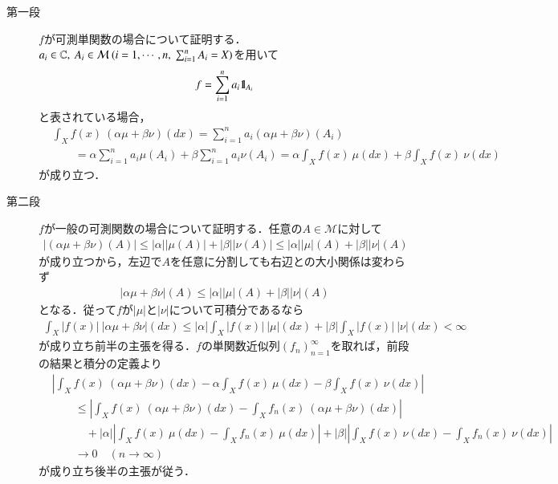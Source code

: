 	\begin{prf}
		\begin{description}
			\item[第一段]
				$f$が可測単関数の場合について証明する．
				$a_i \in \C,\ A_i \in \mathcal{M}\ (i=1,\cdots,n,\ \sum_{i=1}^{n} A_i = X)$を用いて
				\begin{align}
					f = \sum_{i=1}^{n} a_i \mbox{1}\hspace{-0.25em}\mbox{l}_{A_i}
				\end{align}
				と表されている場合，
				\begin{align}
					&\int_X f(x)\ (\alpha\mu + \beta\nu)(dx)
					= \sum_{i=1}^{n} a_i (\alpha\mu + \beta\nu)(A_i) \\
					&\qquad = \alpha \sum_{i=1}^{n} a_i \mu(A_i) + \beta \sum_{i=1}^{n} a_i \nu(A_i)
					= \alpha \int_X f(x)\ \mu(dx) + \beta \int_X f(x)\ \nu(dx)
				\end{align}
				が成り立つ．
				
			\item[第二段]
			$f$が一般の可測関数の場合について証明する．任意の$A \in \mathcal{M}$に対して
			\begin{align}
				\left| (\alpha \mu + \beta \nu)(A) \right| \leq |\alpha||\mu(A)| + |\beta||\nu(A)| \leq |\alpha||\mu|(A) + |\beta||\nu|(A)
 			\end{align}
 			が成り立つから，左辺で$A$を任意に分割しても右辺との大小関係は変わらず
 			\begin{align}
 				|\alpha \mu + \beta \nu|(A) \leq |\alpha||\mu|(A) + |\beta||\nu|(A)
 			\end{align}
 			となる．従って$f$が$|\mu|$と$|\nu|$について可積分であるなら
 			\begin{align}
 				\int_X |f(x)|\ |\alpha \mu + \beta \nu|(dx) \leq |\alpha| \int_X |f(x)|\ |\mu|(dx) + |\beta| \int_X |f(x)|\ |\nu|(dx) < \infty
 			\end{align}
 			が成り立ち前半の主張を得る．$f$の単関数近似列$(f_n)_{n=1}^{\infty}$を取れば，前段の結果と積分の定義より
 			\begin{align}
 				&\left| \int_X f(x)\ (\alpha\mu + \beta\nu)(dx) - \alpha \int_X f(x)\ \mu(dx) - \beta \int_X f(x)\ \nu(dx) \right| \\
 					&\qquad \leq \left| \int_X f(x)\ (\alpha\mu + \beta\nu)(dx) - \int_X f_n(x)\ (\alpha\mu + \beta\nu)(dx) \right| \\
 					&\qquad \quad + |\alpha| \left| \int_X f(x)\ \mu(dx) - \int_X f_n(x)\ \mu(dx) \right|
 					+ |\beta| \left| \int_X f(x)\ \nu(dx) - \int_X f_n(x)\ \nu(dx) \right| \\
 				&\qquad \longrightarrow 0 \quad (n \longrightarrow \infty)
 			\end{align}
 			が成り立ち後半の主張が従う．
 			\QED
		\end{description}
	\end{prf}
	
	\begin{screen}
		\begin{thm}
		\end{thm}
	\end{screen}